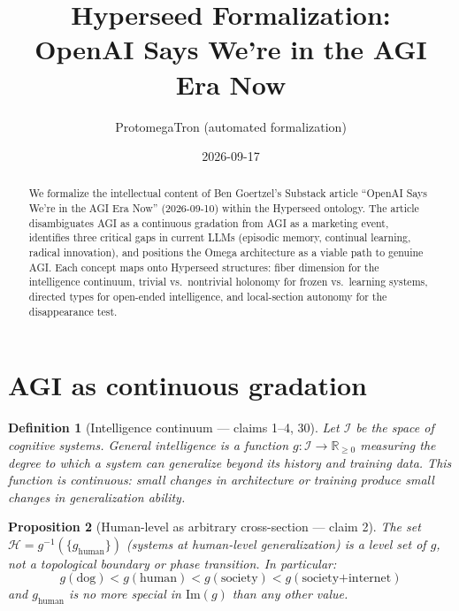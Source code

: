 \documentclass[11pt,a4paper]{article}
\title{Hyperseed Formalization:\\
  OpenAI Says We're in the AGI Era Now}
\author{ProtomegaTron (automated formalization)}
\date{2026-09-17}
\newtheorem{definition}{Definition}[section]
\newtheorem{proposition}[definition]{Proposition}
\begin{document}
\maketitle

\begin{abstract}
We formalize the intellectual content of Ben Goertzel's Substack article
``OpenAI Says We're in the AGI Era Now'' (2026-09-10) within the Hyperseed
ontology. The article disambiguates AGI as a continuous gradation from
AGI as a marketing event, identifies three critical gaps in current LLMs
(episodic memory, continual learning, radical innovation), and positions
the Omega architecture as a viable path to genuine AGI. Each concept maps
onto Hyperseed structures: fiber dimension for the intelligence continuum,
trivial vs.\ nontrivial holonomy for frozen vs.\ learning systems, directed
types for open-ended intelligence, and local-section autonomy for the
disappearance test.
\end{abstract}

\tableofcontents

\section{AGI as continuous gradation}
\label{sec:continuum}

\begin{definition}[Intelligence continuum --- claims 1--4, 30]
\label{def:continuum}
Let $\mathcal{I}$ be the space of cognitive systems. \emph{General intelligence}
is a function $g : \mathcal{I} \to \mathbb{R}_{\geq 0}$ measuring the degree
to which a system can generalize beyond its history and training data.
This function is continuous: small changes in architecture or training
produce small changes in generalization ability.
\end{definition}

\begin{proposition}[Human-level as arbitrary cross-section --- claim 2]
\label{prop:arbitrary}
The set $\mathcal{H} = g^{-1}(\{g_{\text{human}}\})$ (systems at human-level
generalization) is a level set of $g$, not a topological boundary or phase
transition. In particular:
\[
  g(\text{dog}) < g(\text{human}) < g(\text{society}) < g(\text{society+internet})
\]
and $g_{\text{human}}$ is no more special in $\text{Im}(g)$ than any other value.
\end{proposition}
\end{document}
